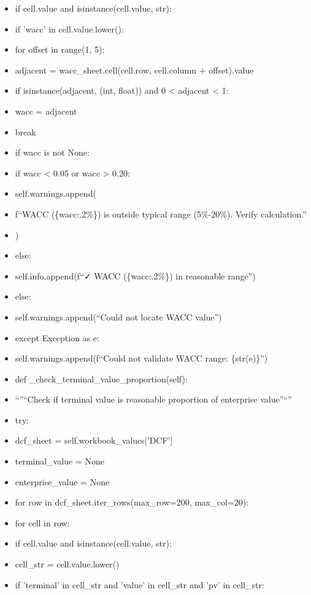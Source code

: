 \documentclass[11pt]{article}
\begin{document}
\begin{itemize}[leftmargin=*,itemsep=2pt,topsep=2pt]
\item {} if cell.value and isinstance(cell.value, str):
\item {} if 'wacc' in cell.value.lower():
\item {} for offset in range(1, 5):
\item {} adjacent = wacc\_\allowbreak{}sheet.cell(cell.row, cell.column + offset).value
\item {} if isinstance(adjacent, (int, float)) and 0 < adjacent < 1:
\item {} wacc = adjacent
\item {} break
\item {} if wacc is not None:
\item {} if wacc < 0.05 or wacc > 0.20:
\item {} self.warnings.append(
\item {} f``WACC (\{wacc:.2\%\}) is outside typical range (5\%-20\%). Verify calculation.''
\item {} )
\item {} else:
\item {} self.info.append(f``✓ WACC (\{wacc:.2\%\}) in reasonable range'')
\item {} else:
\item {} self.warnings.append(``Could not locate WACC value'')
\item {} except Exception as e:
\item {} self.warnings.append(f``Could not validate WACC range: \{str(e)\}'')
\item {} def \_\allowbreak{}check\_\allowbreak{}terminal\_\allowbreak{}value\_\allowbreak{}proportion(self):
\item {} ``''``Check if terminal value is reasonable proportion of enterprise value''``''
\item {} try:
\item {} dcf\_\allowbreak{}sheet = self.workbook\_\allowbreak{}values['DCF']
\item {} terminal\_\allowbreak{}value = None
\item {} enterprise\_\allowbreak{}value = None
\item {} for row in dcf\_\allowbreak{}sheet.iter\_\allowbreak{}rows(max\_\allowbreak{}row=200, max\_\allowbreak{}col=20):
\item {} for cell in row:
\item {} if cell.value and isinstance(cell.value, str):
\item {} cell\_\allowbreak{}str = cell.value.lower()
\item {} if 'terminal' in cell\_\allowbreak{}str and 'value' in cell\_\allowbreak{}str and 'pv' in cell\_\allowbreak{}str:

\end{itemize}
\end{document}
